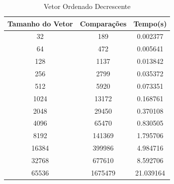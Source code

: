 \documentclass[12pt,a4paper,twoside]{report}
\begin{document}
\begin{table}[h]
  \centering
  \caption{Vetor Ordenado Decrescente \label{tab:od}}
  \begin{tabular}{ccc} \\\hline
  \textbf{Tamanho do Vetor} & \textbf{Comparações} & \textbf{Tempo(s)} \\\hline
  32                        & 189                  & 0.002377\\\hline
  64                        & 472                  & 0.005641
\\\hline
  128                       & 1137                 & 0.013842\\\hline
  256                       & 2799                & 0.035372\\\hline
  512                       & 5920                & 0.073351
\\\hline
  1024                      & 13172               & 0.168761\\\hline
  2048                      & 29450       		 & 0.370108          \\\hline
  4096                      & 65470			 & 0.830505         \\\hline
  8192                      & 141369              & 1.795706\\\hline
  16384                     & 399986             & 4.984716\\\hline
  32768                     & 677610             & 8.592706\\\hline
  65536                     & 1675479			& 21.039164
\\\hline
  \end{tabular}
\end{table}
\end{document}
